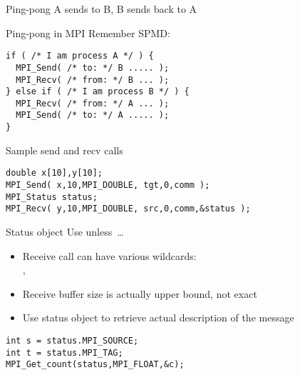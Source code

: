 \begin{numberedframe}{Ping-pong}
  A sends to B, B sends back to A

\end{numberedframe}

\begin{numberedframe}{Ping-pong in MPI}
Remember SPMD:
\lstset{language=C}
\begin{lstlisting}
if ( /* I am process A */ ) {
  MPI_Send( /* to: */ B ..... );
  MPI_Recv( /* from: */ B ... );
} else if ( /* I am process B */ ) {
  MPI_Recv( /* from: */ A ... );
  MPI_Send( /* to: */ A ..... );
}
\end{lstlisting}
\end{numberedframe}

\begin{numberedframe}{Sample send and recv calls}
\begin{lstlisting}
double x[10],y[10];
MPI_Send( x,10,MPI_DOUBLE, tgt,0,comm );
MPI_Status status;
MPI_Recv( y,10,MPI_DOUBLE, src,0,comm,&status );
\end{lstlisting}
\end{numberedframe}


\begin{numberedframe}{Status object}
 Use  unless~\ldots

  \begin{itemize}
  \item Receive call can have various wildcards:\\
    , 
  \item Receive buffer size is actually upper bound, not exact
  \item Use status object to retrieve actual description of the message
  \end{itemize}
\begin{lstlisting}
int s = status.MPI_SOURCE;
int t = status.MPI_TAG;
MPI_Get_count(status,MPI_FLOAT,&c);
\end{lstlisting}
\end{numberedframe}

\begin{exerciseframe}[pingpong]
  
\end{exerciseframe}


